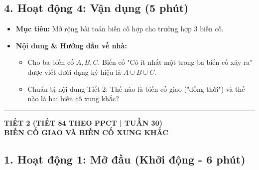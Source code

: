 \documentclass[12pt, a4paper]{article}
\begin{document}
\subsection*{4. Hoạt động 4: Vận dụng (5 phút)}

\begin{itemize}[leftmargin=1.2cm]
    \item[a)] \textbf{Mục tiêu:} Mở rộng bài toán biến cố hợp cho trường hợp 3 biến cố.
    \item[b)] \textbf{Nội dung & Hướng dẫn về nhà:}
    \begin{itemize}[leftmargin=0.6cm]
        \item Cho ba biến cố $A, B, C$. Biến cố "Có ít nhất một trong ba biến cố xảy ra" được viết dưới dạng ký hiệu là $A \cup B \cup C$.
        \item Chuẩn bị nội dung Tiết 2: Thế nào là biến cố giao ("đồng thời") và thế nào là hai biến cố xung khắc?
    \end{itemize}
\end{itemize}

\vspace{10pt}
\hrule
\vspace{10pt}

\begin{center}
    \textbf{\large TIẾT 2 (TIẾT 84 THEO PPCT | TUẦN 30)}\\[4pt]
    \textbf{\large BIẾN CỐ GIAO VÀ BIẾN CỐ XUNG KHẮC}
\end{center}

\subsection*{1. Hoạt động 1: Mở đầu (Khởi động - 6 phút)}
\end{document}

